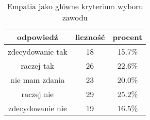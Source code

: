 \begin{table}[H]
\caption{Empatia jako główne kryterium wyboru zawodu}
\centering
\begin{tabular}{ | c | c | c |}
\hline
odpowiedź & liczność & procent\\
\hline
zdecydowanie tak  &  18  & 15.7\% \\
\hline
raczej tak  &  26  & 22.6\% \\
\hline
nie mam zdania  &  23  & 20.0\% \\
\hline
raczej nie  &  29  & 25.2\% \\
\hline
zdecydowanie nie  &  19  & 16.5\% \\
\hline
\end{tabular}
\label{tab:Q34}
\end{table}
